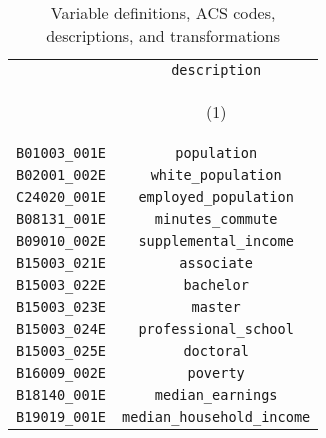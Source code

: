 \begin{table}[tbh]
        \caption{Variable definitions, ACS codes, descriptions, and transformations}
        \label{tab:defs}
        \centering
        \vspace{1em}
        \begin{tabular}{lc}
\toprule
{} &                                                            \texttt{description} \\
{} &                                                 \hypertarget{tabcol:defs1}{(1)} \\
\midrule
\texttt{B01003\_001E}                   &                                                             \texttt{population} \\
\texttt{B02001\_002E}                   &                                                      \texttt{white\_population} \\
\texttt{C24020\_001E}                   &                                                   \texttt{employed\_population} \\
\texttt{B08131\_001E}                   &                                                       \texttt{minutes\_commute} \\
\texttt{B09010\_002E}                   &                                                   \texttt{supplemental\_income} \\
\texttt{B15003\_021E}                   &                                                              \texttt{associate} \\
\texttt{B15003\_022E}                   &                                                               \texttt{bachelor} \\
\texttt{B15003\_023E}                   &                                                                 \texttt{master} \\
\texttt{B15003\_024E}                   &                                                   \texttt{professional\_school} \\
\texttt{B15003\_025E}                   &                                                               \texttt{doctoral} \\
\texttt{B16009\_002E}                   &                                                                \texttt{poverty} \\
\texttt{B18140\_001E}                   &                                                       \texttt{median\_earnings} \\
\texttt{B19019\_001E}                   &                                              \texttt{median\_household\_income} \\

\end{tabular}
\end{table}
